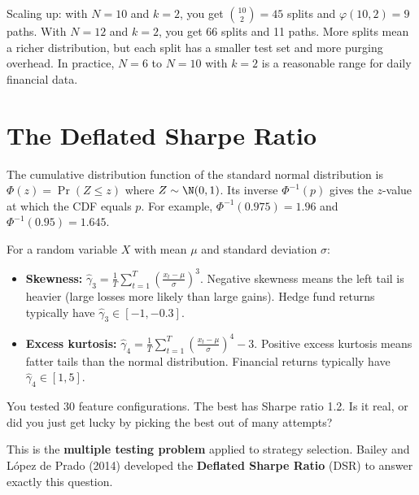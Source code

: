Scaling up: with $N = 10$ and $k = 2$, you get $\binom{10}{2} = 45$ splits and $\varphi(10,2) = 9$ paths. With $N = 12$ and $k = 2$, you get 66 splits and 11 paths. More splits mean a richer distribution, but each split has a smaller test set and more purging overhead. In practice, $N = 6$ to $N = 10$ with $k = 2$ is a reasonable range for daily financial data.

\section{The Deflated Sharpe Ratio}
\label{sec:dsr}

\begin{prereq}
The cumulative distribution function of the standard normal distribution is $\Phi(z) = \Pr(Z \leq z)$ where $Z \sim \N(0,1)$. Its inverse $\Phi^{-1}(p)$ gives the $z$-value at which the CDF equals $p$. For example, $\Phi^{-1}(0.975) = 1.96$ and $\Phi^{-1}(0.95) = 1.645$.
\end{prereq}

\begin{prereq}
For a random variable $X$ with mean $\mu$ and standard deviation $\sigma$:
\begin{itemize}[nosep]
  \item \textbf{Skewness:} $\hat{\gamma}_3 = \frac{1}{T}\sum_{t=1}^{T}\left(\frac{x_t - \mu}{\sigma}\right)^3$. Negative skewness means the left tail is heavier (large losses more likely than large gains). Hedge fund returns typically have $\hat{\gamma}_3 \in [-1, -0.3]$.
  \item \textbf{Excess kurtosis:} $\hat{\gamma}_4 = \frac{1}{T}\sum_{t=1}^{T}\left(\frac{x_t - \mu}{\sigma}\right)^4 - 3$. Positive excess kurtosis means fatter tails than the normal distribution. Financial returns typically have $\hat{\gamma}_4 \in [1, 5]$.
\end{itemize}
\end{prereq}

You tested 30 feature configurations. The best has Sharpe ratio 1.2. Is it real, or did you just get lucky by picking the best out of many attempts?

This is the \textbf{multiple testing problem} applied to strategy selection. Bailey and L\'{o}pez de Prado (2014) developed the \textbf{Deflated Sharpe Ratio} (DSR) to answer exactly this question.

